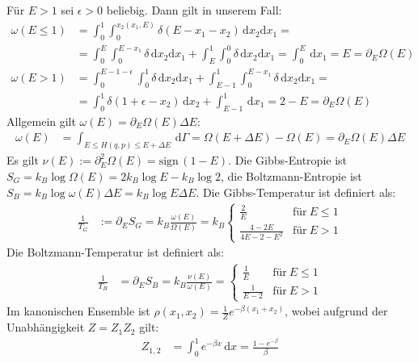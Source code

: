 \documentclass[a4paper,12pt]{article}
\newcommand{\intx}{}
\newcommand{\tecxt}{}
\begin{document}
Für $E>1$ sei $\epsilon>0$ beliebig. Dann gilt in unserem Fall:
\begin{align*}
\omega(E\le 1)&=\intx\int_{0}^{1}\intx\int_{0}^{x_2(x_1,E)}\delta(E-x_1-x_2)\,\mathrm{d}x_2\mathrm{d}x_1=\\
&=\intx\int_{0}^{E}\intx\int_{0}^{E-x_1}\delta\,\mathrm{d}x_2\mathrm{d}x_1+\intx\int_{E}^{1}\intx\int_{0}^{0}\delta\,\mathrm{d}x_2\mathrm{d}x_1=\intx\int_{0}^{E}\,\mathrm{d}x_1=E=\partial_E\Omega(E)\\
\omega(E>1)&=\intx\int_{0}^{E-1-\epsilon}\intx\int_{0}^{1}\delta\,\mathrm{d}x_2\mathrm{d}x_1+\intx\int_{E-1}^{1}\intx\int_{0}^{E-x_1}\delta\,\mathrm{d}x_2\mathrm{d}x_1=\\
&=\intx\int_{0}^{1}\delta(1+\epsilon -x_2)\,\mathrm{d}x_2+\intx\int_{E-1}^{1}\,\mathrm{d}x_1=2-E=\partial_E\Omega(E)
\end{align*}
Allgemein gilt $\omega(E)=\partial_E\Omega(E)\Delta E$:
\begin{align*}
\omega(E)&=\intx\int_{E\le H(q,p)\le E+\Delta E}^{ }\,\mathrm{d}\Gamma=\Omega(E+\Delta E)-\Omega(E)=\partial_E\Omega(E)\Delta E
\end{align*}
Es gilt $\nu(E):=\partial_E^2\Omega(E)=\tecxt\text{sign}\,(1-E)$. Die Gibbs-Entropie ist $S_G=k_B\log\Omega(E)=2k_B\log E-k_B\log 2$, die Boltzmann-Entropie ist $S_B=k_B\log\omega(E)\Delta E=k_B\log E\Delta E$. Die Gibbs-Temperatur ist definiert als:
\begin{align*}
\frac{1}{T_G}&:=\partial_ES_G=k_B\frac{\omega(E)}{\Omega(E)}=k_B\left\{\begin{matrix}
\frac{2}{E}&\tecxt\text{für}\ E\le 1 \\
\frac{4-2E}{4E-2-E^2}&\tecxt\text{für}\ E>1
\end{matrix}\right.
\end{align*}
Die Boltzmann-Temperatur ist definiert als:
\begin{align*}
\frac{1}{T_B}&=\partial_ES_B=k_B\frac{\nu(E)}{\omega(E)}=\left\{\begin{matrix}
\frac{1}{E}&\tecxt\text{für}\ E\le 1\\
\frac{1}{E-2}&\tecxt\text{für}\ E>1
\end{matrix}\right.
\end{align*}
Im kanonischen Ensemble ist $\rho(x_1,x_2)=\frac{1}{Z} e^{-\beta(x_1+x_2)}$, wobei aufgrund der Unabhängigkeit $Z=Z_1Z_2$ gilt:
\begin{align*}
Z_{1,2}&=\intx\int_{0}^{1}e^{-\beta x}\,\mathrm{d}x=\frac{1-e^{-\beta}}{\beta}
\end{align*}
\end{document}
